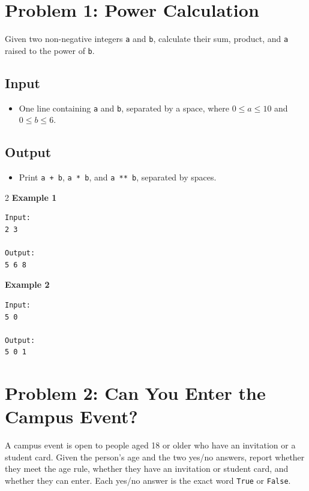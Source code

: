 \documentclass[12pt,oneside,openany]{article}
\begin{document}
\newpage
\section*{Problem 1: Power Calculation}

Given two non-negative integers \texttt{a} and \texttt{b}, calculate their sum, product, and \texttt{a} raised to the power of \texttt{b}.

\subsection*{Input}
\begin{itemize}
    \item One line containing \texttt{a} and \texttt{b}, separated by a space, where $0 \leq a \leq 10$ and $0 \leq b \leq 6$.
\end{itemize}

\subsection*{Output}
\begin{itemize}
    \item Print \texttt{a + b}, \texttt{a * b}, and \texttt{a ** b}, separated by spaces.
\end{itemize}

\vspace{0.2cm}

\begin{example*}{}{}
\begin{multicols}{2}
\textbf{Example 1}
\begin{verbatim}
Input:
2 3

Output:
5 6 8
\end{verbatim}
\textbf{Example 2}
\begin{verbatim}
Input:
5 0

Output:
5 0 1
\end{verbatim}
\end{multicols}
\end{example*}
\newpage
\section*{Problem 2: Can You Enter the Campus Event?}

A campus event is open to people aged 18 or older who have an invitation or a student card. Given the person's age and the two yes/no answers, report whether they meet the age rule, whether they have an invitation or student card, and whether they can enter. Each yes/no answer is the exact word \texttt{True} or \texttt{False}.
\end{document}
